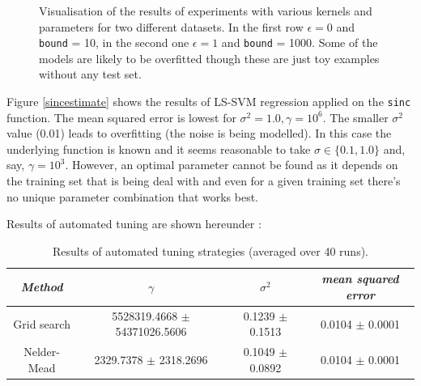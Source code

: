\begin{figure}[h]
\qquad
{}\qquad
\caption{Visualisation of the results of experiments with various kernels and parameters for two different datasets. In the first row $\epsilon=0$ and \texttt{bound} = 10, in the second one $\epsilon=1$ and \texttt{bound} = 1000. Some of the models are likely to be overfitted though these are just toy examples without any test set.}
\label{functionestimation}
\end{figure}


Figure \ref{sincestimate} shows the results of LS-SVM regression applied on the \texttt{sinc} function. The mean squared error is lowest for $\sigma^2=1.0,\gamma=10^6$. The smaller $\sigma^2$ value (0.01) leads to overfitting (the noise is being modelled). In this case the underlying function is known and it seems reasonable to take $\sigma\in\{0.1,1.0\}$ and, say, $\gamma=10^3$. However, an optimal parameter cannot be found as it depends on the training set that is being deal with and even for a given training set there's no unique parameter combination that works best.

\par Results of automated tuning are shown hereunder :

\begin{table}[h]
\centering
\begin{tabular}{c|ccc}
\textit{Method} & $\gamma$ & $\sigma^2$ & \textit{mean squared error} \\
\hline
Grid search & 5528319.4668 $\pm$ 54371026.5606 & 0.1239 $\pm$  0.1513 & 0.0104 $\pm$ 0.0001\\
Nelder-Mead & 2329.7378 $\pm$ 2318.2696 & 0.1049 $\pm$ 0.0892 &  0.0104 $\pm$ 0.0001\\
\end{tabular}
\caption{Results of automated tuning strategies (averaged over 40 runs).}
\label{automatedtuning}
\end{table}


